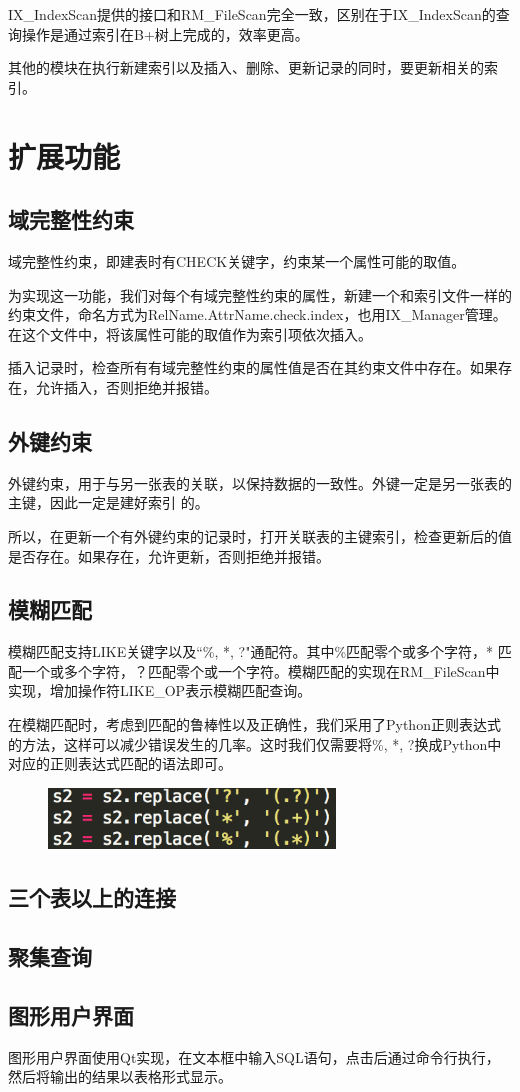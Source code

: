 IX\_IndexScan提供的接口和RM\_FileScan完全一致，区别在于IX\_IndexScan的查询操作是通过索引在B+树上完成的，效率更高。

其他的模块在执行新建索引以及插入、删除、更新记录的同时，要更新相关的索引。

\section{扩展功能}

\subsection{域完整性约束}
域完整性约束，即建表时有CHECK关键字，约束某一个属性可能的取值。

为实现这一功能，我们对每个有域完整性约束的属性，新建一个和索引文件一样的约束文件，命名方式为RelName.AttrName.check.index，也用IX\_Manager管理。在这个文件中，将该属性可能的取值作为索引项依次插入。

插入记录时，检查所有有域完整性约束的属性值是否在其约束文件中存在。如果存在，允许插入，否则拒绝并报错。

\subsection{外键约束}
外键约束，用于与另一张表的关联，以保持数据的一致性。外键一定是另一张表的主键，因此一定是建好索引
的。

所以，在更新一个有外键约束的记录时，打开关联表的主键索引，检查更新后的值是否存在。如果存在，允许更新，否则拒绝并报错。

\subsection{模糊匹配}

模糊匹配支持LIKE关键字以及“\%, *, ?"通配符。其中\%匹配零个或多个字符，* 匹配一个或多个字符，？匹配零个或一个字符。模糊匹配的实现在RM\_FileScan中实现，增加操作符LIKE\_OP表示模糊匹配查询。

在模糊匹配时，考虑到匹配的鲁棒性以及正确性，我们采用了Python正则表达式的方法，这样可以减少错误发生的几率。这时我们仅需要将\%, *, ?换成Python中对应的正则表达式匹配的语法即可。

\begin{figure}[H]
\centering
\includegraphics[width=3in]{Figures/vague.png}
\end{figure}


\subsection{三个表以上的连接}

\subsection{聚集查询}

\subsection{图形用户界面}
图形用户界面使用Qt实现，在文本框中输入SQL语句，点击后通过命令行执行，然后将输出的结果以表格形式显示。
